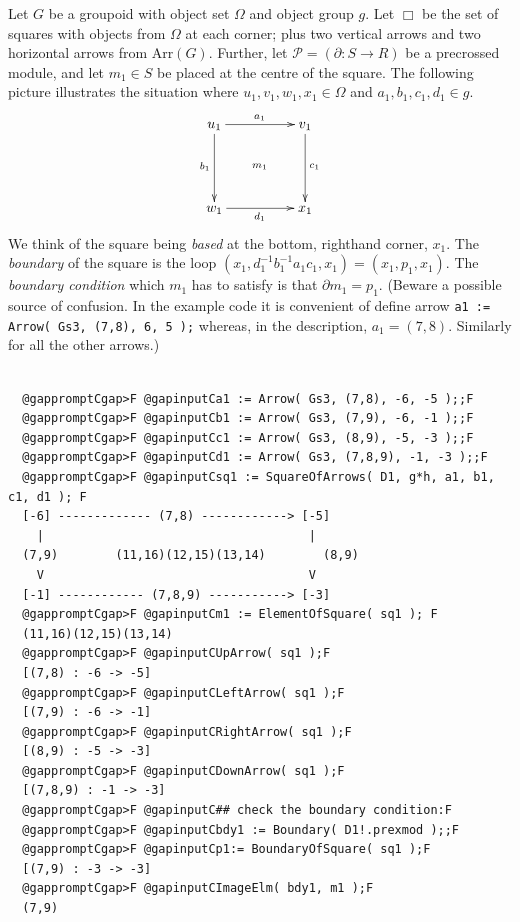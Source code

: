 \documentclass[a4paper,11pt]{report}
\newcommand{\calP}{\mathcal{P}}
\begin{document}
{{{ Let $G$ be a groupoid with object set $\Omega$ and object group $g$. Let $\Box$ be the set of squares with objects from $\Omega$ at each corner; plus two vertical arrows and two horizontal arrows from Arr$(G)$. Further, let $\calP = (\partial : S \to R)$ be a pre\texttt{}crossed module, and let $m_1 \in S$ be placed at the centre of the square. The following picture illustrates the
situation where $u_1,v_1,w_1,x_1 \in \Omega$ and $a_1,b_1,c_1,d_1 \in g$. 
\[  \vcenter{\xymatrix @=4pc{ u_1 \ar[r]^{a_1} \ar[d]_{b_1}\ar@{}[dr] |{m_1} & v_1
\ar[d]^{c_1} \\ w_1 \ar[r]_{d_1} & x_1 }} \]
 We think of the square being \emph{based} at the bottom, right\texttt{}hand corner, $x_1$. The \emph{boundary} of the square is the loop $(x_1, d_1^{-1}b_1^{-1}a_1c_1,x_1) = (x_1,p_1,x_1)$. The \emph{boundary condition} which $m_1$ has to satisfy is that $\partial m_1 = p_1$. (Beware a possible source of confusion. In the example code it is convenient
of define arrow \texttt{a1 := Arrow( Gs3, (7,8), \texttt{}6, \texttt{}5 );} whereas, in the description, $a_1 = (7,8)$. Similarly for all the other arrows.) }

 
\begin{Verbatim}[commandchars=@CF,fontsize=\small,frame=single,label=Example]
  
  @gappromptCgap>F @gapinputCa1 := Arrow( Gs3, (7,8), -6, -5 );;F
  @gappromptCgap>F @gapinputCb1 := Arrow( Gs3, (7,9), -6, -1 );;F
  @gappromptCgap>F @gapinputCc1 := Arrow( Gs3, (8,9), -5, -3 );;F
  @gappromptCgap>F @gapinputCd1 := Arrow( Gs3, (7,8,9), -1, -3 );;F
  @gappromptCgap>F @gapinputCsq1 := SquareOfArrows( D1, g*h, a1, b1, c1, d1 ); F
  [-6] ------------- (7,8) ------------> [-5]
    |                                     |
  (7,9)        (11,16)(12,15)(13,14)        (8,9)
    V                                     V
  [-1] ------------ (7,8,9) -----------> [-3]
  @gappromptCgap>F @gapinputCm1 := ElementOfSquare( sq1 ); F
  (11,16)(12,15)(13,14)
  @gappromptCgap>F @gapinputCUpArrow( sq1 );F
  [(7,8) : -6 -> -5]
  @gappromptCgap>F @gapinputCLeftArrow( sq1 );F
  [(7,9) : -6 -> -1]
  @gappromptCgap>F @gapinputCRightArrow( sq1 );F
  [(8,9) : -5 -> -3]
  @gappromptCgap>F @gapinputCDownArrow( sq1 );F
  [(7,8,9) : -1 -> -3]
  @gappromptCgap>F @gapinputC## check the boundary condition:F
  @gappromptCgap>F @gapinputCbdy1 := Boundary( D1!.prexmod );;F
  @gappromptCgap>F @gapinputCp1:= BoundaryOfSquare( sq1 );F
  [(7,9) : -3 -> -3]
  @gappromptCgap>F @gapinputCImageElm( bdy1, m1 );F
  (7,9)
  

\end{Verbatim}}}
\end{document}
